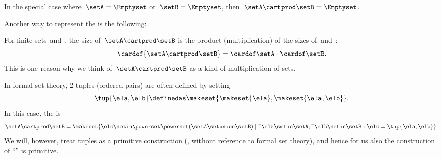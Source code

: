 In the special case where~$\setA = \Emptyset$ or~$\setB = \Emptyset$, then~$\setA \cartprod \setB = \Emptyset$.

Another way to represent the  is the following:
%

%

\begin{remark}
    For finite sets~\setA and~\setB, the size of~$\setA \cartprod \setB$ is the product (multiplication) of the sizes of~\setA and~\setB:
    \begin{equation}
        \cardof{\setA \cartprod \setB} = \cardof\setA \cdot \cardof \setB.
    \end{equation}
    This is one reason why we think of~$\setA \cartprod \setB$ as a kind of multiplication of sets.
\end{remark}

\begin{remark}
\label{rem:formal-cartesian}
    In formal set theory, 2-tuples (ordered pairs) are often defined by setting
    \begin{equation}
        \label{eq:ordered-pair}
        \tup{\ela, \elb} \definedas \makeset{ \makeset{\ela }, \makeset{ \ela, \elb } }.
    \end{equation}
    In this case, the  is
    \begin{equation}
        \setA \cartprod \setB = \makeset{ \elc \setin\powerset \powerset (\setA \setunion \setB) \mid \exists \ela \setin\setA, \exists \elb \setin\setB : \elc = \tup{\ela, \elb} }.
    \end{equation}
    We will, however, treat tuples as a primitive construction (\ie, without reference to formal set theory), and hence for us also the construction of ``'' is primitive.
\end{remark}

